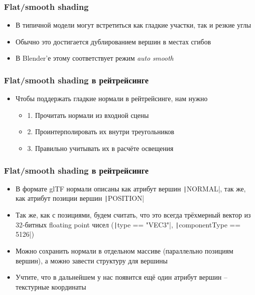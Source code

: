 \documentclass[10pt]{beamer}
\begin{document}
\begin{frame}
\frametitle{Flat/smooth shading}
\begin{itemize}
\item В типичной модели могут встретиться как гладкие участки, так и резкие углы
\pause
\item Обычно это достигается дублированием вершин в местах сгибов
\pause
\item В Blender'е этому соответствует режим \textit{auto smooth}
\end{itemize}
\end{frame}

\begin{frame}
\frametitle{Flat/smooth shading в рейтрейсинге}
\begin{itemize}
\item Чтобы поддержать гладкие нормали в рейтрейсинге, нам нужно
\pause
\begin{itemize}
\item 1. Прочитать нормали из входной сцены
\pause
\item 2. Проинтерполировать их внутри треугольников
\pause
\item 3. Правильно учитывать их в расчёте освещения
\end{itemize}
\end{itemize}
\end{frame}

\begin{frame}
\frametitle{Flat/smooth shading в рейтрейсинге}
\begin{itemize}
\item В формате glTF нормали описаны как атрибут вершин \texttt|NORMAL|, так же, как атрибут позиции вершин \texttt|POSITION|
\pause
\item Так же, как с позициями, будем считать, что это всегда трёхмерный вектор из 32-битных floating point чисел (\texttt|type == "VEC3"|, \texttt|componentType == 5126|)
\pause
\item Можно сохранить нормали в отдельном массиве (параллельно позициям вершин), а можно завести структуру для вершины
\pause
\item Учтите, что в дальнейшем у нас появится ещё один атрибут вершин -- текстурные координаты
\end{itemize}
\end{frame}
\end{document}
